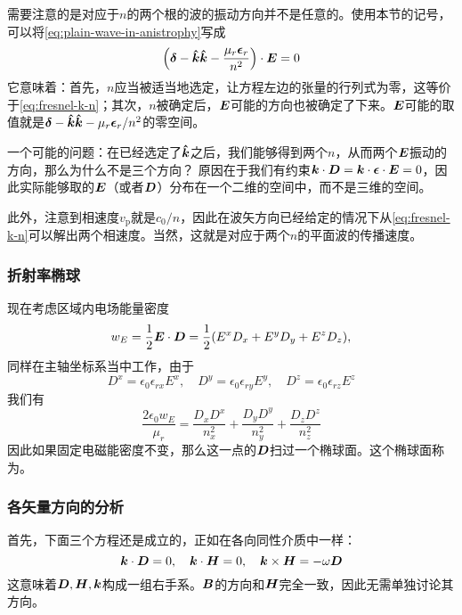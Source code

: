 需要注意的是对应于$n$的两个根的波的振动方向并不是任意的。使用本节的记号，可以将\eqref{eq:plain-wave-in-anistrophy}写成
\begin{equation}
    \left(\vb*{\delta} - \vu*{k}\vu*{k} - \frac{\mu_r \vb*{\epsilon}_r}{n^2} \right) \cdot \vb*{E} = 0
\end{equation}
它意味着：首先，$n$应当被适当地选定，让方程左边的张量的行列式为零，这等价于\eqref{eq:fresnel-k-n}；其次，$n$被确定后，$\vb*{E}$可能的方向也被确定了下来。$\vb*{E}$可能的取值就是$\vb*{\delta} - \vu*{k}\vu*{k} - \mu_r \vb*{\epsilon}_r / n^2$的零空间。

一个可能的问题：在已经选定了$\vu*{k}$之后，我们能够得到两个$n$，从而两个$\vb*{E}$振动的方向，那么为什么不是三个方向？
原因在于我们有约束$\vb*{k} \cdot \vb*{D} = \vb*{k} \cdot \vb*{\epsilon} \cdot \vb*{E} = 0$，因此实际能够取的$\vb*{E}$（或者$\vb*{D}$）分布在一个二维的空间中，而不是三维的空间。

此外，注意到相速度$v_\text{p}$就是$c_0 / n$，因此在波矢方向已经给定的情况下从\eqref{eq:fresnel-k-n}可以解出两个相速度。当然，这就是对应于两个$n$的平面波的传播速度。

\subsubsection{折射率椭球}

现在考虑区域内电场能量密度
\[
    w_E = \frac{1}{2} \vb*{E} \cdot \vb*{D} = \frac{1}{2} (E^x D_x + E^y D_y + E^z D_z),
\]
同样在主轴坐标系当中工作，由于
\[
    D^x = \epsilon_0 \epsilon_{rx} E^x, \quad D^y = \epsilon_0 \epsilon_{ry} E^y, \quad D^z = \epsilon_0 \epsilon_{rz} E^z
\]
我们有
\begin{equation}
    \frac{2 \epsilon_0 w_E}{\mu_r} = \frac{D_x D^x}{n_x^2} + \frac{D_y D^y}{n_y^2} + \frac{D_z D^z}{n_z^2}
\end{equation}
因此如果固定电磁能密度不变，那么这一点的$\vb*{D}$扫过一个椭球面。这个椭球面称为。

\subsubsection{各矢量方向的分析}

首先，下面三个方程还是成立的，正如在各向同性介质中一样：
\[
    \vb*{k} \cdot \vb*{D} = 0, \quad \vb*{k} \cdot \vb*{H} = 0, \quad \vb*{k} \times \vb*{H} = - \omega \vb*{D}
\]
这意味着$\vb*{D}, \vb*{H}, \vb*{k}$构成一组右手系。$\vb*{B}$的方向和$\vb*{H}$完全一致，因此无需单独讨论其方向。

